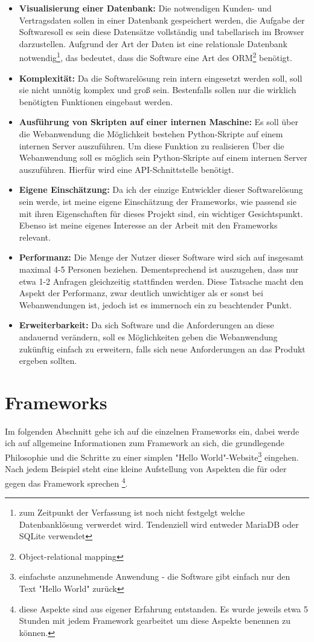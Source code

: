 \documentclass[letterpaper,11pt,leqno]{article}
\begin{document}
\begin{itemize}
	\item\textbf{Visualisierung einer Datenbank:} Die notwendigen Kunden- und Vertragsdaten sollen in einer Datenbank gespeichert
	werden, die Aufgabe der Softwaresoll es sein diese Datensätze vollständig und tabellarisch im Browser darzustellen. Aufgrund der
	Art der Daten ist eine relationale Datenbank notwendig\footnote{zum Zeitpunkt der Verfassung ist noch nicht festgelgt welche
	Datenbanklösung verwerdet wird. Tendenziell wird entweder MariaDB oder SQLite verwendet}, das bedeutet, dass die Software eine
	Art des ORM\footnote{Object-relational mapping} benötigt.
	\item\textbf{Komplexität:} Da die Softwarelösung rein intern eingesetzt werden soll, soll sie nicht unnötig komplex und groß
	sein. Bestenfalls sollen nur die wirklich benötigten Funktionen eingebaut werden.
	\item\textbf{Ausführung von Skripten auf einer internen Maschine:} Es soll über die Webanwendung die Möglichkeit bestehen
	Python-Skripte auf einem internen Server auszuführen. Um diese Funktion zu realisieren Über die Webanwendung soll es möglich
	sein Python-Skripte auf einem internen Server auszuführen. Hierfür wird eine API-Schnittstelle benötigt.
	\item\textbf{Eigene Einschätzung:} Da ich der einzige Entwickler dieser Softwarelösung sein werde, ist meine eigene Einschätzung
	der Frameworks, wie passend sie mit ihren Eigenschaften für dieses Projekt sind, ein wichtiger Gesichtspunkt. Ebenso ist meine
	eigenes Interesse an der Arbeit mit den Frameworks relevant.
	\item\textbf{Performanz:} Die Menge der Nutzer dieser Software wird sich auf insgesamt maximal 4-5 Personen beziehen.
	Dementsprechend ist auszugehen, dass nur etwa 1-2 Anfragen gleichzeitig stattfinden werden. Diese Tatsache macht den Aspekt der
	Performanz, zwar deutlich unwichtiger als er sonst bei Webanwendungen ist, jedoch ist es immernoch ein zu beachtender Punkt.
	\item\textbf{Erweiterbarkeit:} Da sich Software und die Anforderungen an diese andauernd verändern, soll es Möglichkeiten geben
	die Webanwendung zukünftig einfach zu erweitern, falls sich neue Anforderungen an das Produkt ergeben sollten.
\end{itemize}

\section{Frameworks}
Im folgenden Abschnitt gehe ich auf die einzelnen Frameworks ein, dabei werde ich auf allgemeine Informationen zum Framework an
sich, die grundlegende Philosophie und die Schritte zu einer simplen "Hello World"-Website\footnote{einfachste anzunehmende
Anwendung - die Software gibt einfach nur den Text "Hello World" zurück} eingehen. Nach jedem Beispiel steht eine kleine Aufstellung
von Aspekten die für oder gegen das Framework sprechen \footnote{diese Aspekte sind aus eigener Erfahrung entstanden. Es wurde
jeweils etwa 5 Stunden mit jedem Framework gearbeitet um diese Aspekte benennen zu können.}.
\end{document}
